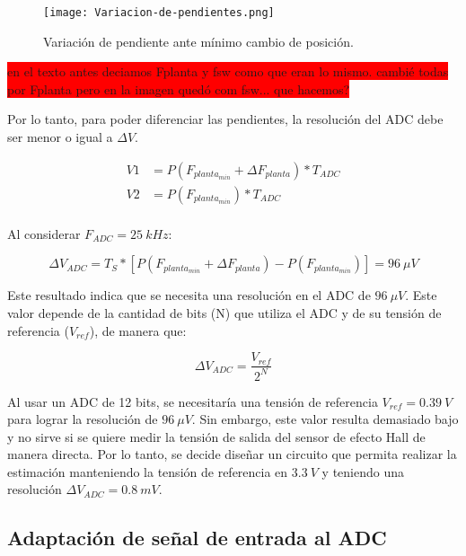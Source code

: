 \begin{figure}[H]
	\centering
	\texttt{[image: Variacion-de-pendientes.png]}
	\caption{Variación de pendiente ante mínimo cambio de posición.}
	\label{fig:variacion-de-pendiente}
\end{figure}

\colorbox{red}{en el texto antes deciamos Fplanta y fsw como que eran lo mismo. cambié todas por Fplanta pero en la imagen quedó com fsw... que hacemos?}

 Por lo tanto, para poder diferenciar las pendientes, la resolución del ADC debe ser menor o igual a $\Delta V$.

\begin{equation} 
	\begin{aligned}
		V1 &= P(F_{planta_{min}} + \Delta F_{planta})* T_{ADC} \\
		V2 &= P(F_{planta_{min}})* T_{ADC} \\		 
	\end{aligned}
\end{equation}

 Al considerar $F_{ADC} = 25\:kHz$:

\begin{equation} 
	\Delta V_{ADC} = T_S * [P(F_{planta_{min}} + \Delta F_{planta}) - P(F_{planta_{min}})] = 96\:\mu V
\end{equation}



 Este resultado indica que se necesita una resolución en el ADC de $96\:\mu V$. Este valor depende de la cantidad de bits (N) que utiliza el ADC y de su tensión de referencia ($V_{ref}$), de manera que:
 
 \begin{equation*}
 	\Delta V_{ADC}=\frac{V_{ref}}{2^N}
 \end{equation*}

Al usar un ADC de 12 bits, se necesitaría una tensión de referencia $V_{ref} = 0.39\:V$ para lograr la resolución de $96\:\mu V$. Sin embargo, este valor resulta demasiado bajo y no sirve si se quiere medir la tensión de salida del sensor de efecto Hall de manera directa. Por lo tanto, se decide diseñar un circuito que permita realizar la estimación manteniendo la tensión de referencia en $3.3\:V$ y teniendo una resolución $\Delta V_{ADC}=0.8\:mV$.

\subsection{Adaptación de señal de entrada al ADC}\label{sec_adaptacion_señal_vh_ADC}

